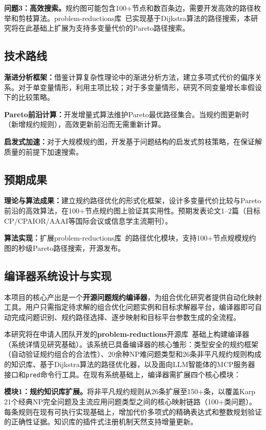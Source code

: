 \textbf{问题3：高效搜索。}规约图可能包含100+节点和数百条边，需要开发高效的路径枚举和剪枝算法。problem-reductions库~\cite{ProblemReductions2025}已实现基于Dijkstra算法的路径搜索，本研究将在此基础上扩展为支持多变量代价的Pareto路径搜索。

\subsection{技术路线}

\textbf{渐进分析框架：}借鉴计算复杂性理论中的渐进分析方法，建立多项式代价的偏序关系。对于单变量情形，利用主项比较；对于多变量情形，研究不同变量增长率假设下的比较策略。

\textbf{Pareto前沿计算：}开发增量式算法维护Pareto最优路径集合。当规约图更新时（新增规约规则），高效更新前沿而无需重新计算。

\textbf{启发式加速：}对于大规模规约图，开发基于问题结构的启发式剪枝策略，在保证解质量的前提下加速搜索。

\subsection{预期成果}

\textbf{理论与算法成果：}建立规约路径优化的形式化框架，设计多变量代价比较与Pareto前沿的高效算法，在100+节点规约图上验证其实用性。预期发表论文1--2篇（目标CP/CPAIOR/AAAI等国际会议或信息学主流期刊）。

\textbf{算法实现：}扩展problem-reductions库~\cite{ProblemReductions2025}的路径优化模块，支持100+节点规模规约图的秒级Pareto路径搜索，开源发布。

\subsection{编译器系统设计与实现}

本项目的核心产出是一个\textbf{开源问题规约编译器}，为组合优化研究者提供自动化映射工具。用户只需指定待求解的组合优化问题实例和目标求解器平台，编译器即可自动完成问题识别、规约路径选择、逐步映射和目标平台参数生成的全流程。

本研究将在申请人团队开发的\textbf{problem-reductions}开源库~\cite{ProblemReductions2025}基础上构建编译器（系统详情见研究基础）。该系统已具备编译器的核心雏形：类型安全的规约框架（自动验证规约组合的合法性）、20余种NP难问题类型和26条非平凡规约规则构成的知识库、基于Dijkstra算法的路径优化器，以及面向LLM智能体的MCP服务器接口和\texttt{pred}命令行工具。在现有系统基础上，编译器需扩展四个核心模块：

\textbf{模块1：规约知识库扩展。}将非平凡规约规则从26条扩展至150+条，以覆盖Karp 21个经典NP完全问题及主流应用问题类型之间的核心映射链路（100+类问题）。每条规则在现有可执行实现基础上，增加代价多项式的精确表达式和整数规划验证的正确性证据。知识库的插件式注册机制天然支持增量更新。

